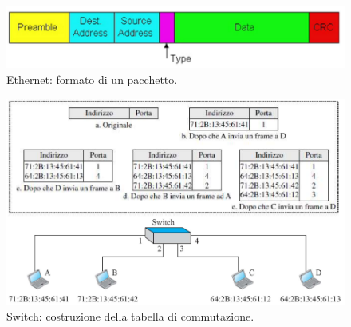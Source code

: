 \documentclass[11pt, italian, openany]{book}
\begin{document}
\begin{sloppypar}
\begin{figure}[!h]
	\centering
	\includegraphics[scale=0.45]{images/ethernet-pacchetto.png}
	\caption{Ethernet: formato di un pacchetto.}
	\label{fig:ethernet-pacchetto}
\end{figure}

\pagebreak

\begin{figure}[!h]
	\centering
	\includegraphics[scale=0.45]{images/switch-self-learning.png}
	\caption{Switch: costruzione della tabella di commutazione.}
	\label{fig:switch-self-learning}
\end{figure}


\end{sloppypar}
\end{document}
